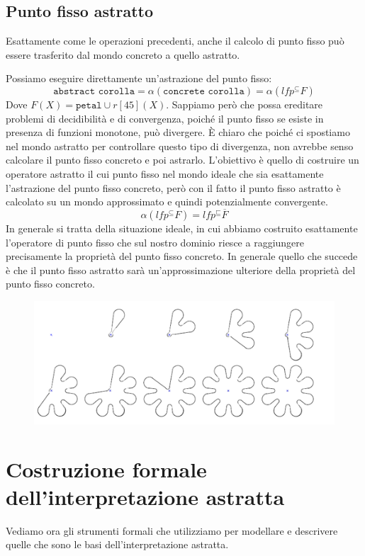 \subsection{Punto fisso astratto}
Esattamente come le operazioni precedenti, anche il calcolo di punto fisso 
può essere trasferito dal mondo concreto a quello astratto.

Possiamo eseguire direttamente un'astrazione del punto fisso:
\[
  \texttt{abstract corolla} = \alpha(\texttt{concrete corolla}) =
    \alpha(lfp^{\subseteq} F)  
\]
Dove $F(X)= \texttt{petal} \cup r[45](X)$.
Sappiamo però che possa ereditare problemi di decidibilità 
e di convergenza, poiché il punto fisso se esiste in presenza di 
funzioni monotone, può divergere. È chiaro che poiché ci spostiamo 
nel mondo astratto per controllare questo tipo di divergenza, non avrebbe 
senso calcolare il punto fisso concreto e poi astrarlo. L'obiettivo 
è quello di costruire un operatore astratto il cui punto fisso nel mondo 
ideale che sia esattamente l'astrazione del punto fisso concreto, 
però con il fatto il punto fisso astratto è calcolato su un mondo 
approssimato e quindi potenzialmente convergente.
\[
    \alpha(lfp^{\subseteq} F) = lfp^{\sqsubseteq} \overline{F}
\]
In generale si tratta della situazione ideale, in cui abbiamo costruito 
esattamente l'operatore di punto fisso che sul nostro dominio riesce 
a raggiungere precisamente la proprietà del punto fisso concreto.
In generale quello che succede è che il punto fisso astratto sarà 
un'approssimazione ulteriore della proprietà del punto fisso concreto.

\begin{figure}[H]
    \centering
    \includegraphics[scale=0.6]{img/abstractfixpoint.png}
\end{figure}

\section{Costruzione formale dell'interpretazione astratta}
Vediamo ora gli strumenti formali che utilizziamo per modellare e 
descrivere quelle che sono le basi dell'interpretazione astratta.

